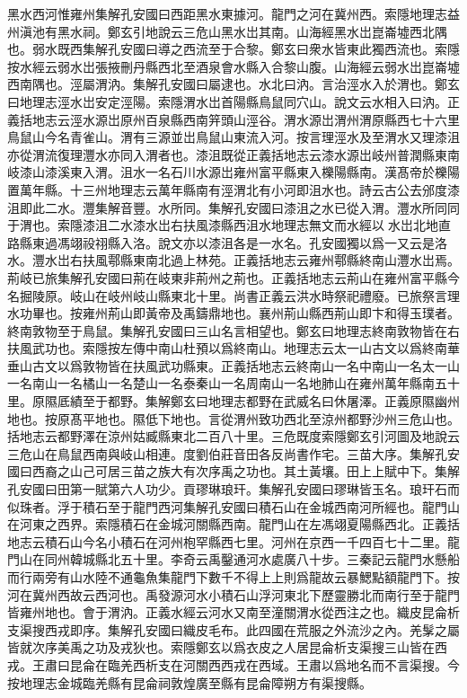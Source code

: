 黑水西河惟雍州集解孔安國曰西距黑水東據河。龍門之河在冀州西。索隱地理志益州滇池有黑水祠。鄭玄引地說云三危山黑水岀其南。山海經黑水岀崑崙墟西北隅也。弱水既西集解孔安國曰導之西流至于合黎。鄭玄曰衆水皆東此獨西流也。索隱按水經云弱水岀張掖刪丹縣西北至酒泉會水縣入合黎山腹。山海經云弱水岀崑崙墟西南隅也。涇屬渭汭。集解孔安國曰屬逮也。水北曰汭。言治涇水入於渭也。鄭玄曰地理志涇水岀安定涇陽。索隱渭水岀首陽縣鳥鼠同穴山。說文云水相入曰汭。正義括地志云涇水源岀原州百泉縣西南笄頭山涇谷。渭水源岀渭州渭原縣西七十六里鳥鼠山今名青雀山。渭有三源並岀鳥鼠山東流入河。按言理涇水及至渭水又理漆沮亦從渭流復理灃水亦同入渭者也。漆沮既從正義括地志云漆水源岀岐州普潤縣東南岐漆山漆溪東入渭。沮水一名石川水源岀雍州富平縣東入櫟陽縣南。漢髙帝於櫟陽置萬年縣。十三州地理志云萬年縣南有涇渭北有小河即沮水也。詩云古公去邠度漆沮即此二水。灃集解音豐。水所同。集解孔安國曰漆沮之水已從入渭。灃水所同同于渭也。索隱漆沮二水漆水岀右扶風漆縣西沮水地理志無文而水經以𣻐水岀北地直路縣東過馮翊祋祤縣入洛。說文亦以漆沮各是一水名。孔安國獨以爲一又云是洛水。灃水岀右扶風鄠縣東南北過上林苑。正義括地志云雍州鄠縣終南山灃水岀焉。荊岐已旅集解孔安國曰荊在岐東非荊州之荊也。正義括地志云荊山在雍州富平縣今名掘陵原。岐山在岐州岐山縣東北十里。尚書正義云洪水時祭祀禮廢。已旅祭言理水功畢也。按雍州荊山即黃帝及禹鑄鼎地也。襄州荊山縣西荊山即卞和得玉璞者。終南敦物至于鳥鼠。集解孔安國曰三山名言相望也。鄭玄曰地理志終南敦物皆在右扶風武功也。索隱按左傳中南山杜預以爲終南山。地理志云太一山古文以爲終南華垂山古文以爲敦物皆在扶風武功縣東。正義括地志云終南山一名中南山一名太一山一名南山一名橘山一名楚山一名泰秦山一名周南山一名地肺山在雍州萬年縣南五十里。原隰厎績至于都野。集解鄭玄曰地理志都野在武威名曰休屠澤。正義原隰幽州地也。按原髙平地也。隰低下地也。言從渭州致功西北至涼州都野沙州三危山也。括地志云都野澤在涼州姑臧縣東北二百八十里。三危既度索隱鄭玄引河圖及地說云三危山在鳥鼠西南與岐山相連。度劉伯莊音田各反尚書作宅。三苗大序。集解孔安國曰西裔之山己可居三苗之族大有次序禹之功也。其土黃壤。田上上賦中下。集解孔安國曰田第一賦第六人功少。貢璆琳琅玕。集解孔安國曰璆琳皆玉名。琅玕石而似珠者。浮于積石至于龍門西河集解孔安國曰積石山在金城西南河所經也。龍門山在河東之西界。索隱積石在金城河關縣西南。龍門山在左馮翊夏陽縣西北。正義括地志云積石山今名小積石在河州枹罕縣西七里。河州在京西一千四百七十二里。龍門山在同州韓城縣北五十里。李奇云禹鑿通河水處廣八十步。三秦記云龍門水懸船而行兩旁有山水陸不通龜魚集龍門下數千不得上上則爲龍故云暴鰓點額龍門下。按河在冀州西故云西河也。禹發源河水小積石山浮河東北下歷靈勝北而南行至于龍門皆雍州地也。會于渭汭。正義水經云河水又南至潼關渭水從西注之也。織皮昆侖析支渠搜西戎即序。集解孔安國曰織皮毛布。此四國在荒服之外流沙之內。羌髳之屬皆就次序美禹之功及戎狄也。索隱鄭玄以爲衣皮之人居昆侖析支渠搜三山皆在西戎。王肅曰昆侖在臨羌西析支在河關西西戎在西域。王肅以爲地名而不言渠搜。今按地理志金城臨羌縣有昆侖祠敦煌廣至縣有昆侖障朔方有渠搜縣。

